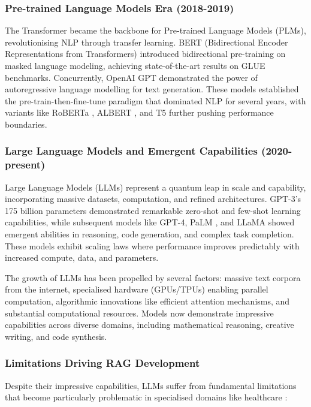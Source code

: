 \subsubsection{Pre-trained Language Models Era (2018-2019)}
The Transformer became the backbone for Pre-trained Language Models (PLMs), revolutionising NLP through transfer learning. BERT (Bidirectional Encoder Representations from Transformers) \citep{devlin2019bert} introduced bidirectional pre-training on masked language modeling, achieving state-of-the-art results on GLUE benchmarks. Concurrently, OpenAI GPT \citep{radford2019language} demonstrated the power of autoregressive language modelling for text generation. These models established the pre-train-then-fine-tune paradigm that dominated NLP for several years, with variants like RoBERTa \citep{liu2019roberta}, ALBERT \citep{lan2020albert}, and T5 \citep{raffel2020t5} further pushing performance boundaries.

\subsubsection{Large Language Models and Emergent Capabilities (2020-present)}
Large Language Models (LLMs) represent a quantum leap in scale and capability, incorporating massive datasets, computation, and refined architectures. GPT-3's 175 billion parameters \citep{brown2020language} demonstrated remarkable zero-shot and few-shot learning capabilities, while subsequent models like GPT-4, PaLM \citep{chowdhery2022palm}, and LLaMA \citep{touvron2023llama} showed emergent abilities in reasoning, code generation, and complex task completion. These models exhibit scaling laws \citep{kaplan2020scaling} where performance improves predictably with increased compute, data, and parameters.

The growth of LLMs has been propelled by several factors: massive text corpora from the internet, specialised hardware (GPUs/TPUs) enabling parallel computation, algorithmic innovations like efficient attention mechanisms, and substantial computational resources. Models now demonstrate impressive capabilities across diverse domains, including mathematical reasoning, creative writing, and code synthesis.

\subsubsection{Limitations Driving RAG Development}
Despite their impressive capabilities, LLMs suffer from fundamental limitations that become particularly problematic in specialised domains like healthcare \citep{ji2023survey}:

